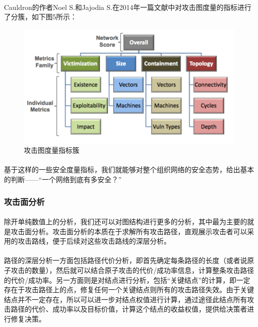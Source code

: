 \documentclass[12pt,a4paper]{article}
\begin{document}
\paragraph{}
Cauldron的作者Noel S.和Jajodia S.在2014年一篇文献中对攻击图度量的指标进行了分簇，如下图5所示：
\begin{figure}[!htp]
	\centering
	\includegraphics[scale=0.40]{images/metrics.png} 
	\caption{攻击图度量指标簇}
\end{figure}

\paragraph{}
基于这样的一些安全度量指标，我们就能够对整个组织网络的安全态势，给出基本的判断——“一个网络到底有多安全？”

\subsubsection{攻击面分析}

\paragraph{}
除开单纯数值上的分析，我们还可以对图结构进行更多的分析，其中最为主要的就是攻击面分析。攻击面分析的本质在于求解所有攻击路径，直观展示攻击者可以采用的攻击路线，便于后续对这些攻击路线的深层分析。

\paragraph{}
路径的深层分析一方面包括路径代价分析，即首先确定每条路径的长度（或者说原子攻击的数量），然后就可以结合原子攻击的代价/成功率信息，计算整条攻击路径的代价/成功率。另一方面则是对结点进行分析，包括“关键结点”的计算，即一定存在于攻击路径上的点，修复任何一个关键结点则所有的攻击路径失效。由于关键结点并不一定存在，所以可以进一步对结点权值进行计算，通过途径此结点所有攻击路径的代价、成功率以及目标价值，计算这个结点的收益权值，提供给决策者进行修复决策。
\end{document}
